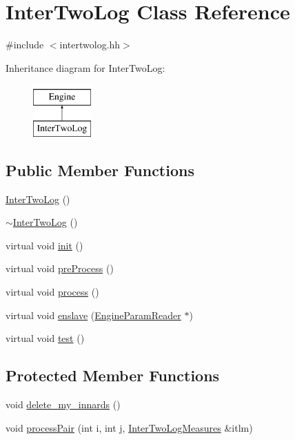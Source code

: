 \hypertarget{classInterTwoLog}{
\section{InterTwoLog Class Reference}
\label{classInterTwoLog}
}


{\ttfamily \#include $<$intertwolog.hh$>$}

Inheritance diagram for InterTwoLog:\begin{figure}[H]
\begin{center}
\leavevmode
\includegraphics[height=2cm]{classInterTwoLog}
\end{center}
\end{figure}
\subsection*{Public Member Functions}
\begin{DoxyCompactItemize}
\item 
\hyperlink{classInterTwoLog_a4a7f06e802d741bac0b9934dd68b1fd3}{InterTwoLog} ()
\item 
\hyperlink{classInterTwoLog_a95e66b67f292f3bdd719fb6d57adcf1e}{$\sim$InterTwoLog} ()
\item 
virtual void \hyperlink{classInterTwoLog_af5dbc57497069c182c6101211fe2b64a}{init} ()
\item 
virtual void \hyperlink{classInterTwoLog_a581fcf71571bce5c0861e963c16f220b}{preProcess} ()
\item 
virtual void \hyperlink{classInterTwoLog_abd4e1bdf33314432d4a57193de056905}{process} ()
\item 
virtual void \hyperlink{classInterTwoLog_aa96d91206c19b781d222f0d6e13bf51d}{enslave} (\hyperlink{classEngineParamReader}{EngineParamReader} $\ast$)
\item 
virtual void \hyperlink{classInterTwoLog_a525b88900b11ed13cdefd73f5024e2eb}{test} ()
\end{DoxyCompactItemize}
\subsection*{Protected Member Functions}
\begin{DoxyCompactItemize}
\item 
void \hyperlink{classInterTwoLog_a01c7c507e0f2e66d38da544cd68cb76e}{delete\_\-my\_\-innards} ()
\item 
void \hyperlink{classInterTwoLog_ac83b4a0881e7d882fad88e25833cc565}{processPair} (int i, int j, \hyperlink{structInterTwoLogMeasures}{InterTwoLogMeasures} \&itlm)
\end{DoxyCompactItemize}
